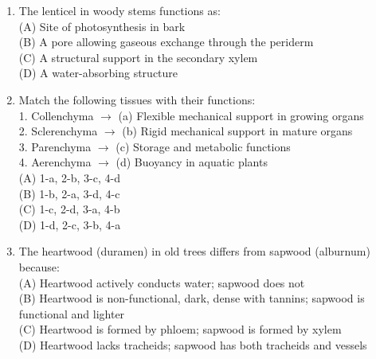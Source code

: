 \documentclass{article}
\begin{document}
\begin{enumerate}[label=Q\arabic*.]
\item The lenticel in woody stems functions as:
\\(A) Site of photosynthesis in bark
\\(B) A pore allowing gaseous exchange through the periderm
\\(C) A structural support in the secondary xylem
\\(D) A water-absorbing structure

\item Match the following tissues with their functions:\\
1. Collenchyma $\rightarrow$ (a) Flexible mechanical support in growing organs\\
2. Sclerenchyma $\rightarrow$ (b) Rigid mechanical support in mature organs\\
3. Parenchyma $\rightarrow$ (c) Storage and metabolic functions\\
4. Aerenchyma $\rightarrow$ (d) Buoyancy in aquatic plants
\\(A) 1-a, 2-b, 3-c, 4-d
\\(B) 1-b, 2-a, 3-d, 4-c
\\(C) 1-c, 2-d, 3-a, 4-b
\\(D) 1-d, 2-c, 3-b, 4-a

\item The heartwood (duramen) in old trees differs from sapwood (alburnum) because:
\\(A) Heartwood actively conducts water; sapwood does not
\\(B) Heartwood is non-functional, dark, dense with tannins; sapwood is functional and lighter
\\(C) Heartwood is formed by phloem; sapwood is formed by xylem
\\(D) Heartwood lacks tracheids; sapwood has both tracheids and vessels

\end{enumerate}
\end{document}
